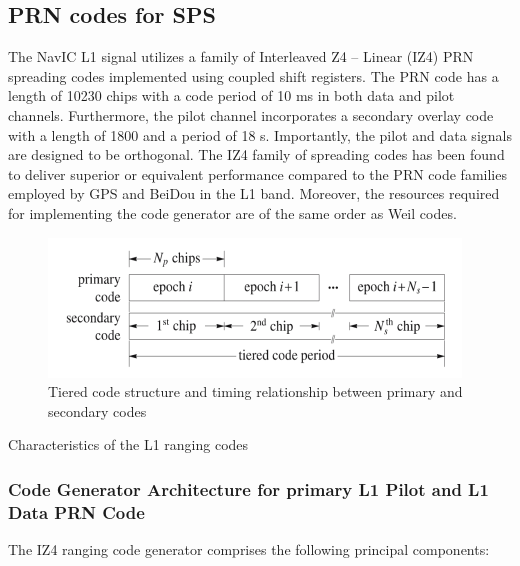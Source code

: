 \subsection{PRN codes for SPS}

\noindent The NavIC L1 signal utilizes a family of Interleaved Z4 – Linear (IZ4) PRN spreading codes implemented using coupled shift registers. The PRN code has a length of 10230 chips with a code period of 10 ms in both data and pilot channels. Furthermore, the pilot channel incorporates a secondary overlay code with a length of 1800 and a period of 18 s. Importantly, the pilot and data signals are designed to be orthogonal.
The IZ4 family of spreading codes has been found to deliver superior or equivalent performance compared to the PRN code families employed by GPS and BeiDou in the L1 band. Moreover, the resources required for implementing the code generator are of the same order as Weil codes.


\begin{figure}[ht]
\centering
\includegraphics[width=\columnwidth]{figs/Tiered_code.png}
\centering
\captionsetup{justification=centering}
\caption{Tiered code structure and timing relationship between primary and secondary codes}
\label{fig:R0_IZ4}
\end{figure}



\begin{table}[h]
\small

\vspace{3mm}
\caption{Characteristics of the L1 ranging codes}
\label{table:L1_ranging}
\end{table}

\subsubsection{Code Generator Architecture for primary L1 Pilot and L1 Data PRN Code}

\noindent The IZ4 ranging code generator comprises the following principal components:

